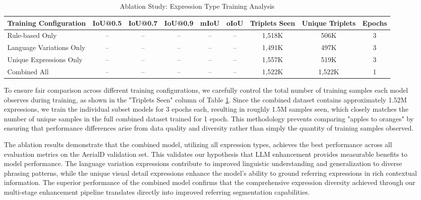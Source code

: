 \begin{table}[H]
\centering
\caption{Ablation Study: Expression Type Training Analysis}
\label{tab:ablation_expression_types}
{\footnotesize
\begin{tabular}{@{}p{3.2cm}cccccccc@{}}
\toprule
\textbf{Training Configuration} & \textbf{IoU@0.5} & \textbf{IoU@0.7} & \textbf{IoU@0.9} & \textbf{mIoU} & \textbf{oIoU} & \textbf{Triplets Seen} & \textbf{Unique Triplets} & \textbf{Epochs} \\
\midrule
Rule-based Only & -- & -- & -- & -- & -- & 1,518K & 506K & 3 \\
Language Variations Only & -- & -- & -- & -- & -- & 1,491K & 497K & 3 \\
Unique Expressions Only & -- & -- & -- & -- & -- & 1,557K & 519K & 3 \\
Combined All & -- & -- & -- & -- & -- & 1,522K & 1,522K & 1 \\
\bottomrule
\end{tabular}%
}
\end{table}

To ensure fair comparison across different training configurations, we carefully control the total number of training samples each model observes during training, as shown in the "Triplets Seen" column of Table \ref{tab:ablation_expression_types}. Since the combined dataset contains approximately 1.52M expressions, we train the individual subset models for 3 epochs each, resulting in roughly 1.5M samples seen, which closely matches the number of unique samples in the full combined dataset trained for 1 epoch. This methodology prevents comparing "apples to oranges" by ensuring that performance differences arise from data quality and diversity rather than simply the quantity of training samples observed.

The ablation results demonstrate that the combined model, utilizing all expression types, achieves the best performance across all evaluation metrics on the AerialD validation set. This validates our hypothesis that LLM enhancement provides measurable benefits to model performance. The language variation expressions contribute to improved linguistic understanding and generalization to diverse phrasing patterns, while the unique visual detail expressions enhance the model's ability to ground referring expressions in rich contextual information. The superior performance of the combined model confirms that the comprehensive expression diversity achieved through our multi-stage enhancement pipeline translates directly into improved referring segmentation capabilities.
